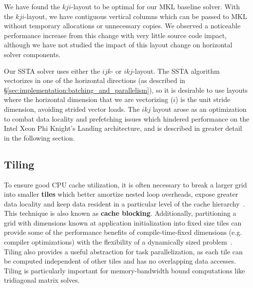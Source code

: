 \documentclass{sig-alternate-05-2015}
\begin{document}
We have found the \(kji\)-layout to be optimal for our MKL baseline solver.
With the \(kji\)-layout, we have contiguous vertical columns which can be
  passed to MKL without temporary allocations or unnecessary copies.
We observed a noticeable performance increase from this change with very
  little source code impact, although we have not studied the impact of this
  layout change on horizontal solver components.


Our SSTA solver uses either the \(ijk\)- or \(ikj\)-layout.
The SSTA algorithm vectorizes in one of the horizontal directions (as described
  in \S\ref{sec:implementation:batching_and_parallelism}), so it is desirable to
  use layouts where the horizontal dimension that we are vectorizing (\(i\)) is
  the unit stride dimension, avoiding strided vector loads.
The \(ikj\) layout arose as an optimization to combat data locality and prefetching
  issues which hindered performance on the Intel Xeon Phi Knight's Landing
  architecture, and is described in greater detail in the following section.

\subsection{Tiling}
\label{sec:implementation:tiling}

To ensure good CPU cache utilization, it is often necessary to break a larger
  grid into smaller \textbf{tiles} which better amortize nested loop overheads, expose
  greater data locality and keep data resident in a particular level of the
  cache hierarchy~\cite{blocked_algorithms}.
This technique is also known as \textbf{cache blocking}.
Additionally, partitioning a grid with dimensions known at application
  initialization into fixed size tiles can provide some of the performance
  benefits of compile-time-fixed dimensions (e.g. compiler optimizations) with
  the flexibility of a dynamically sized problem~\cite{kokkos}.
Tiling also provides a useful abstraction for task parallelization, as
  each tile can be computed independent of other tiles and has no overlapping
  data accesses.
Tiling is particularly important for memory-bandwidth bound computations like
  tridiagonal matrix solves.
\end{document}
